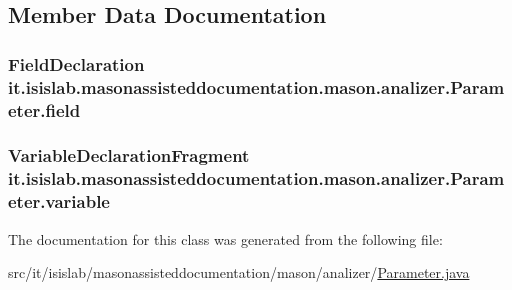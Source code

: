 \subsection{Member Data Documentation}
\hypertarget{classit_1_1isislab_1_1masonassisteddocumentation_1_1mason_1_1analizer_1_1_parameter_af1c679e712110eca7b088ce336208ca2}{
\subsubsection[{field}]{\setlength{\rightskip}{0pt plus 5cm}Field\-Declaration it.\-isislab.\-masonassisteddocumentation.\-mason.\-analizer.\-Parameter.\-field\hspace{0.3cm}{\ttfamily [private]}}}\label{classit_1_1isislab_1_1masonassisteddocumentation_1_1mason_1_1analizer_1_1_parameter_af1c679e712110eca7b088ce336208ca2}
\hypertarget{classit_1_1isislab_1_1masonassisteddocumentation_1_1mason_1_1analizer_1_1_parameter_a01644b9462f906462ae41ae5dd61cf3f}{
\subsubsection[{variable}]{\setlength{\rightskip}{0pt plus 5cm}Variable\-Declaration\-Fragment it.\-isislab.\-masonassisteddocumentation.\-mason.\-analizer.\-Parameter.\-variable\hspace{0.3cm}{\ttfamily [private]}}}\label{classit_1_1isislab_1_1masonassisteddocumentation_1_1mason_1_1analizer_1_1_parameter_a01644b9462f906462ae41ae5dd61cf3f}


The documentation for this class was generated from the following file\-:\begin{DoxyCompactItemize}
\item 
src/it/isislab/masonassisteddocumentation/mason/analizer/\hyperlink{_parameter_8java}{Parameter.\-java}\end{DoxyCompactItemize}
